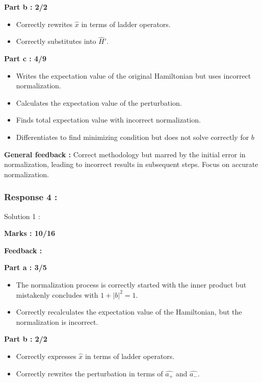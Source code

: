\documentclass[a4paper,11pt]{article}
\begin{document}
\textbf{Part b : 2/2}

\begin{itemize}
    \item Correctly rewrites $\hat{x}$ in terms of ladder operators.
    \item Correctly substitutes into $\hat{H}'$.
\end{itemize}

\textbf{Part c : 4/9}

\begin{itemize}
    \item Writes the expectation value of the original Hamiltonian but uses incorrect normalization.
    \item Calculates the expectation value of the perturbation.
    \item Finds total expectation value with incorrect normalization.
    \item Differentiates to find minimizing condition but does not solve correctly for $b$
\end{itemize}

\textbf{General feedback :}
Correct methodology but marred by the initial error in normalization, leading to incorrect results in subsequent steps. Focus on accurate normalization.


\subsubsection*{Response 4 :}

Solution 1 :

\textbf{Marks : 10/16}

\textbf{Feedback :}

\textbf{Part a : 3/5}

\begin{itemize}
    \item The normalization process is correctly started with the inner product but mistakenly concludes with $1 + |b|^2 = 1$.
    \item Correctly recalculates the expectation value of the Hamiltonian, but the normalization is incorrect.
\end{itemize}

\textbf{Part b : 2/2}

\begin{itemize}
    \item Correctly expresses $\hat{x}$ in terms of ladder operators.
    \item Correctly rewrites the perturbation in terms of $\hat{a_+}$ and $\hat{a_-}$.
\end{itemize}
\end{document}
